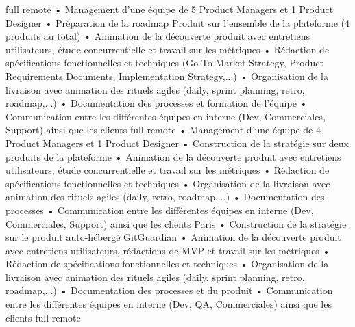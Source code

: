 \documentclass[
	a4paper,
	maincolor=re,
	sidecolor=bg-2,
	sidetextcolor=tex-3,
	sectioncolor=re,
	subsectioncolor=tex-2,
	itemtextcolor=tex-3,
	profilepicsize=3.5cm,
	profilepicborderwidth=2pt,
]{fortysecondscv}
\begin{document}
\pagecolor{bg}
\makefrontsidebar

\begin{cvtable}[2.5]
	{full remote}{
		• Management d’une équipe de 5 Product Managers et 1 Product 
		Designer\newline
	 	• Préparation de la roadmap Produit sur l’ensemble de la plateforme
	 	(4 produits au total)\newline
	 	• Animation de la découverte produit avec entretiens utilisateurs, 
	 	étude concurrentielle et travail sur les métriques\newline
	 	• Rédaction de spécifications fonctionnelles et techniques (Go-To-Market 
		Strategy, Product Requirements Documents, Implementation 
		Strategy,...)\newline
	 	• Organisation de la livraison avec animation des rituels agiles (daily, 
		sprint planning, retro, roadmap,...)\newline
	 	• Documentation des processes et formation de l’équipe\newline
	 	• Communication entre les différentes équipes en interne (Dev, 
		Commerciales, Support) ainsi que les clients
	}
	{full remote}{
		• Management d’une équipe de 4 Product Managers et 1 Product Designer\newline
		• Construction de la stratégie sur deux produits de la plateforme\newline
		• Animation de la découverte produit avec entretiens utilisateurs, étude concurrentielle et travail sur les métriques\newline
		• Rédaction de spécifications fonctionnelles et techniques\newline
		• Organisation de la livraison avec animation des rituels agiles (daily, retro, roadmap,...)\newline
		• Documentation des processes\newline
		• Communication entre les différentes équipes en interne (Dev, Commerciales, Support) ainsi que les clients
	}
	{Paris}{
		• Construction de la stratégie sur le produit auto-hébergé 
		GitGuardian\newline
		• Animation de la découverte produit avec entretiens utilisateurs,
		rédactions de MVP et travail sur les métriques\newline
		• Rédaction de spécifications fonctionnelles et techniques\newline
		• Organisation de la livraison avec animation des rituels agiles
		(daily, sprint planning, retro, roadmap,...)\newline
		• Documentation des processes et du produit\newline
		• Communication entre les différentes équipes en interne (Dev, QA, Commerciales) ainsi que les clients
	}
		{full remote}
        { \newline}
\end{cvtable}
\end{document}
